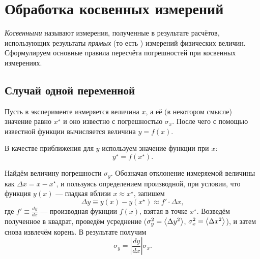 \section{Обработка косвенных измерений\label{sec:kosv}}

\emph{Косвенными} называют измерения, полученные в результате расчётов,
использующих результаты \emph{прямых} (то есть )
измерений физических величин. Сформулируем основные правила пересчёта
погрешностей при косвенных измерениях.

\subsection{Случай одной переменной}

Пусть в эксперименте измеряется величина $x$, а её 
(в некотором смысле) значение равно $x^{\star}$ и оно известно с
погрешностью $\sigma_{x}$. После чего с помощью известной функции
вычисляется величина $y=f\!\left(x\right)$.

В качестве  приближения для $y$ используем значение функции
при  $x$:
\[
y^{\star}=f\!\left(x^{\star}\right).
\]

Найдём величину погрешности $\sigma_{y}$. Обозначая отклонение измеряемой
величины как $\Delta x=x-x^{\star}$, и пользуясь определением производной,
при условии, что функция $y\left(x\right)$ --- гладкая
вблизи $x\approx x^{\star}$, запишем
\[
\Delta y\equiv y\left(x\right)-y\left(x^{\star}\right)\approx f'\cdot\Delta x,
\]
где $f'\equiv\frac{dy}{dx}$ --- производная фукнции $f(x)$, взятая в точке
$x^{\star}$. Возведём полученное в квадрат, проведём усреднение
($\sigma_{y}^{2}=\left<\Delta y^{2}\right>$,
$\sigma_{x}^{2}=\left<\Delta x^{2}\right>$), и затем снова извлечём
корень. В результате получим
\begin{equation}
\boxed{{\sigma_{y}=\left|\frac{dy}{dx}\right|\sigma_{x}.}}\label{eq:sxy}
\end{equation}



